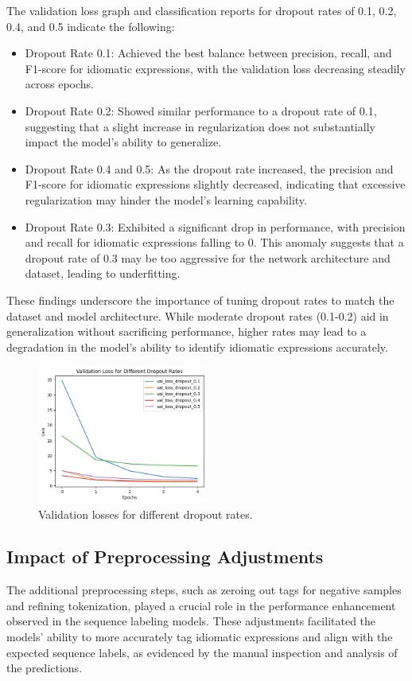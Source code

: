 \documentclass[conference]{IEEEtran}
\begin{document}
The validation loss graph and classification reports for dropout rates of 0.1, 0.2, 0.4, and 0.5 indicate the following:

\begin{itemize}
\item Dropout Rate 0.1: Achieved the best balance between precision, recall, and F1-score for idiomatic expressions, with the validation loss decreasing steadily across epochs.
\item Dropout Rate 0.2: Showed similar performance to a dropout rate of 0.1, suggesting that a slight increase in regularization does not substantially impact the model's ability to generalize.
\item Dropout Rate 0.4 and 0.5: As the dropout rate increased, the precision and F1-score for idiomatic expressions slightly decreased, indicating that excessive regularization may hinder the model's learning capability.
\item Dropout Rate 0.3: Exhibited a significant drop in performance, with precision and recall for idiomatic expressions falling to 0. This anomaly suggests that a dropout rate of 0.3 may be too aggressive for the network architecture and dataset, leading to underfitting.
\end{itemize}

These findings underscore the importance of tuning dropout rates to match the dataset and model architecture. While moderate dropout rates (0.1-0.2) aid in generalization without sacrificing performance, higher rates may lead to a degradation in the model's ability to identify idiomatic expressions accurately.

\begin{figure}[htbp]
\centerline{\includegraphics[width=0.5\textwidth]{val_loss_for_dropout_rates.png}}
\caption{Validation losses for different dropout rates.}
\end{figure}

\subsection{Impact of Preprocessing Adjustments}
The additional preprocessing steps, such as zeroing out tags for negative samples and refining tokenization, played a crucial role in the performance enhancement observed in the sequence labeling models. These adjustments facilitated the models' ability to more accurately tag idiomatic expressions and align with the expected sequence labels, as evidenced by the manual inspection and analysis of the predictions.
\end{document}
